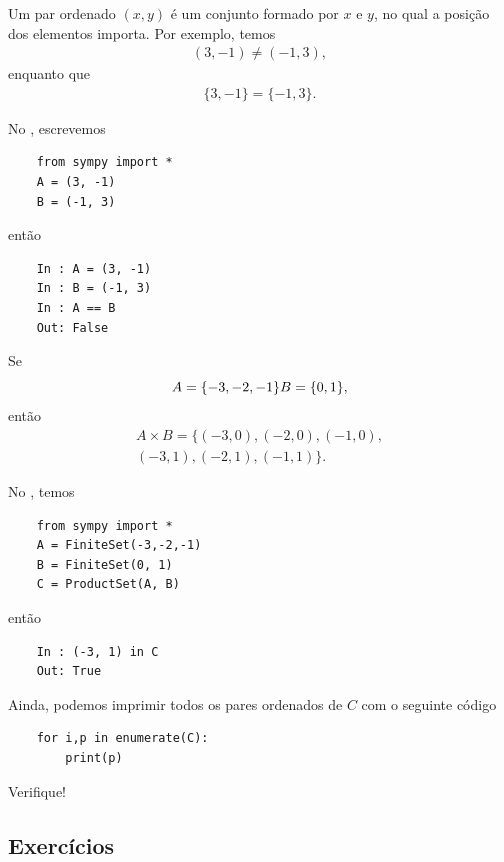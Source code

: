 \begin{obs}
  Um par ordenado $(x, y)$ é um conjunto formado por $x$ e $y$, no qual a posição dos elementos importa. Por exemplo, temos
  \begin{gather}
    (3, -1) \neq (-1, 3),
  \end{gather}
  enquanto que
  \begin{gather}
    \{3, -1\} = \{-1, 3\}.
  \end{gather}

  \ifispython
  No \python, escrevemos
  \begin{lstlisting}
    from sympy import *
    A = (3, -1)
    B = (-1, 3)
  \end{lstlisting}
  então
  \begin{lstlisting}
    In : A = (3, -1)
    In : B = (-1, 3)
    In : A == B
    Out: False
  \end{lstlisting}
  \fi
\end{obs}

\begin{ex}
  Se
  \begin{equation}
    A = \{-3, -2, -1\}\\
    B = \{0, 1\},
  \end{equation}
  então
  \begin{gather}
    A\times B = \{(-3,0), (-2, 0), (-1, 0), \\
    (-3, 1), (-2, 1), (-1, 1)\}.
  \end{gather}

  \ifispython
  No \python, temos
  \begin{lstlisting}
    from sympy import *
    A = FiniteSet(-3,-2,-1)
    B = FiniteSet(0, 1)
    C = ProductSet(A, B)
  \end{lstlisting}
  então
  \begin{lstlisting}
    In : (-3, 1) in C 
    Out: True
  \end{lstlisting}
  Ainda, podemos imprimir todos os pares ordenados de $C$ com o seguinte código
  \begin{lstlisting}
    for i,p in enumerate(C):
        print(p)
  \end{lstlisting}
  Verifique!    
  \fi
\end{ex}

\subsection*{Exercícios}

